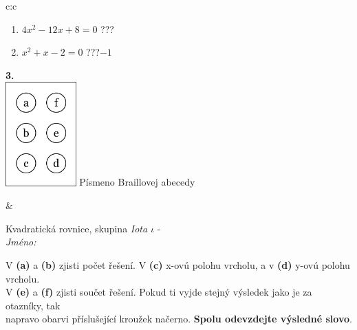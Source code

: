 \documentclass[10pt]{report}
\begin{document}
\begin{tabular}{c:c}
\begin{minipage}[c][104.5mm][t]{0.5\linewidth}
\begin{center}
\begin{minipage}{0.79\linewidth}
\begin{center}
\begin{varwidth}{\linewidth}
\begin{enumerate}
\item $4x^2-12x+8=0$\quad \dotfill\; ???\;\dotfill {}
\item $x^2+x-2=0$\quad \dotfill\; ???\;\dotfill \quad $-1$
\end{enumerate}
\end{varwidth}
\end{center}
\end{minipage}
\begin{minipage}{0.20\linewidth}
\begin{center}
{\Huge\bfseries 3.} \\[2mm]
\includegraphics[height=40mm]{../images/braille.png}
{\small Písmeno Braillovej abecedy}
\end{center}
\end{minipage}
\end{center}
\end{minipage}
&
\begin{minipage}[c][104.5mm][t]{0.5\linewidth}
\begin{center}
\vspace{7mm}
{\huge Kvadratická rovnice, skupina \textit{Iota $\iota$} -}\\[5mm]
\textit{Jméno:}\phantom{xxxxxxxxxxxxxxxxxxxxxxxxxxxxxxxxxxxxxxxxxxxxxxxxxxxxxxxxxxxxxxxxx}\\[5mm]
\begin{minipage}{0.95\linewidth}
\begin{center}
V \textbf{(a)} a \textbf{(b)} zjisti počet řešení. V \textbf{(c)} x-ovú polohu vrcholu, a v \textbf{(d)} y-ovú polohu vrcholu.\\V \textbf{(e)} a \textbf{(f)} zjisti součet řešení. Pokud ti vyjde stejný výsledek jako je za otazníky, tak\\napravo obarvi příslušející kroužek načerno. \textbf{Spolu odevzdejte výsledné slovo}.
\end{center}
\end{minipage}
\\[1mm]
\begin{minipage}{0.79\linewidth}
\begin{center}

\end{center}
\end{minipage}
\end{center}
\end{minipage}
\end{tabular}
\end{document}
